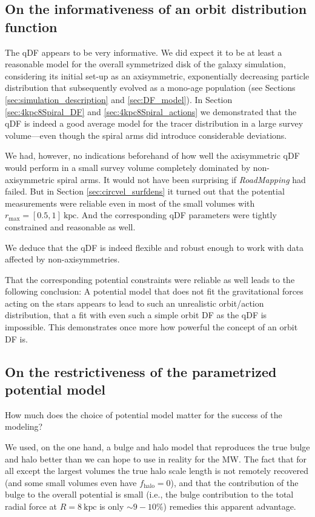 \documentclass[iop,revtex4,numberedappendix,appendixfloats]{emulateapj}
\newcommand{\RM}{{\sl RoadMapping}}
\begin{document}
\subsection{On the informativeness of an orbit distribution function}

The qDF appears to be very informative. We did expect it to be at least a reasonable model for the overall symmetrized disk of the galaxy simulation, considering its initial set-up as an axisymmetric, exponentially decreasing particle distribution that subsequently evolved as a mono-age population (see Sections \ref{sec:simulation_description} and \ref{sec:DF_model}). In Section \ref{sec:4kpc8Spiral_DF} and \ref{sec:4kpc8Spiral_actions} we demonstrated that the qDF is indeed a good average model for the tracer distribution in a large survey volume---even though the spiral arms did introduce considerable deviations.

We had, however, no indications beforehand of how well the axisymmetric qDF would perform in a small survey volume completely dominated by non-axisymmetric spiral arms. It would not have been surprising if \RM{} had failed. But in Section \ref{sec:circvel_surfdens} it turned out that the potential measurements were reliable even in most of the small volumes with $r_\text{max}=[0.5,1]~\text{kpc}$. And the corresponding qDF parameters were tightly constrained and reasonable as well. 

We deduce that the qDF is indeed flexible and robust enough to work with data affected by non-axisymmetries.

That the corresponding potential constraints were reliable as well leads to the following conclusion: A potential model that does not fit the gravitational forces acting on the stars appears to lead to such an unrealistic orbit/action distribution, that a fit with even such a simple orbit DF as the qDF is impossible. This demonstrates once more how powerful the concept of an orbit DF is.

\subsection{On the restrictiveness of the parametrized potential model}

How much does the choice of potential model matter for the success of the modeling?

We used, on the one hand, a bulge and halo model that reproduces the true bulge and halo better than we can hope to use in reality for the MW. The fact that for all except the largest volumes the true halo scale length is not remotely recovered (and some small volumes even have $f_\text{halo}=0$), and that the contribution of the bulge to the overall potential is small (i.e., the bulge contribution to the total radial force at $R=8~\text{kpc}$ is only $\sim 9-10\%$) remedies this apparent advantage. 
\end{document}
